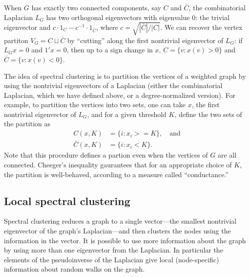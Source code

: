 \documentclass[12pt]{article}
\theoremstyle{plain}
\begin{document}
When $G$ has exactly two connected components, say $C$ and $\bar C$,
the combinatorial Laplacian $L_G$ has two orthogonal eigenvectors
with eigenvalue $0$: the trivial eigenvector and
$c \cdot 1_C - c^{-1} \cdot 1_{\bar C}$, where
$c = \sqrt{|\bar C| / |C|}$.  We can recover the vertex partiton
$V_G = C \sqcup \bar C$ by ``cutting'' along the first nontrivial
eigenvector of $L_G$: if $L_G x = 0$ and $1' x = 0$, then up to a sign
change in $x$, $C = \{ v : x(v) > 0 \}$ and
$\bar C = \{ v : x(v) < 0 \}$.

The idea of spectral clustering is to partition the vertices of a
weighted graph by using the nontrivial eigenvectors of a Laplacian
(either the combinatorial Laplacian, which we have defined above, or a
degree-normalized version).  For example, to partition the vertices
into two sets, one can take $x$, the first nontrivial eigenvector of
$L_G$, and for a given threshold $K$, define the two sets of the partition as
\begin{align*}
  C(x,K)      &= \{ i : x_i >= K \}, \quad \text{and} \\
  \bar C(x,K) &= \{ i : x_i < K \}.
\end{align*}
Note that this procedure defines a partion even when the vertices of
$G$ are all connected.  Cheeger's inequality gaurantees that for an
appropriate choice of $K$, the partition is well-behaved, according to a
measure called ``conductance.''


\subsection{Local spectral clustering}

Spectral clustering reduces a graph to a single vector---the smallest
nontrivial eigenvector of the graph's Laplacian---and then clusters
the nodes using the information in the vector.  It is possible to use
more information about the graph by using more than one eigenvector
from the Laplacian.  In particular the elements of the pseudoinverse
of the Laplacian give local (node-specific) information about random
walks on the graph.
\end{document}
